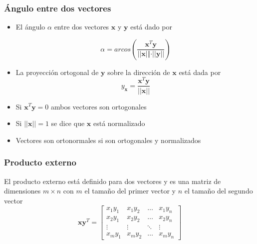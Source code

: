 \documentclass{beamer}
\begin{document}
\begin{frame}
\frametitle{Ángulo entre dos vectores}
\begin{itemize}
\item El ángulo $\alpha$ entre dos vectores $\boldsymbol{x}$  y $\boldsymbol{y}$ está dado por 


 
\begin{equation*}
\alpha= arcos \left(  \frac{\boldsymbol{x}^T \boldsymbol{y}}{\vert \vert \boldsymbol{x} \vert \Vert \cdot \vert \vert \boldsymbol{y} \vert \vert}\right)
\end{equation*}
\item La proyección ortogonal de $\boldsymbol{y}$ sobre la dirección de $\boldsymbol{x}$ está dada por 
\begin{equation*}
y_{\boldsymbol{x}}= \frac{\boldsymbol{x}^T\boldsymbol{y}}{\vert \vert \boldsymbol{x} \vert \vert}
\end{equation*}

\item Si $\boldsymbol{x}^T\boldsymbol{y}=0$ ambos vectores son ortogonales 
\item Si $\vert \vert \boldsymbol{x} \vert \vert =1$ se dice que $\boldsymbol{x}$ está normalizado 
\item Vectores son ortonormales si son ortogonales y normalizados

\end{itemize}
\end{frame}
\begin{frame}
\frametitle{Producto externo}
El producto externo está definido para dos vectores y es una matriz de dimensiones $m \times n$  con $m$ el tamaño del primer vector y $n$ el tamaño del segundo vector
\begin{equation*}
\boldsymbol{x} \boldsymbol{y}^T  =\begin{bmatrix} x_{1}y_{1} &  x_{1}y_{2} & \dots & x_{1}y_{n}\\ x_{2}y_{1} &  x_{2}y_{2} & \dots & x_{2}y_{n} \\ \vdots &  \vdots & \ddots & \vdots \\ x_{m}y_{1} &  x_{m}y_{2} & \dots & x_{m}y_{n} \end{bmatrix} 
\end{equation*}
\end{frame}
\end{document}
